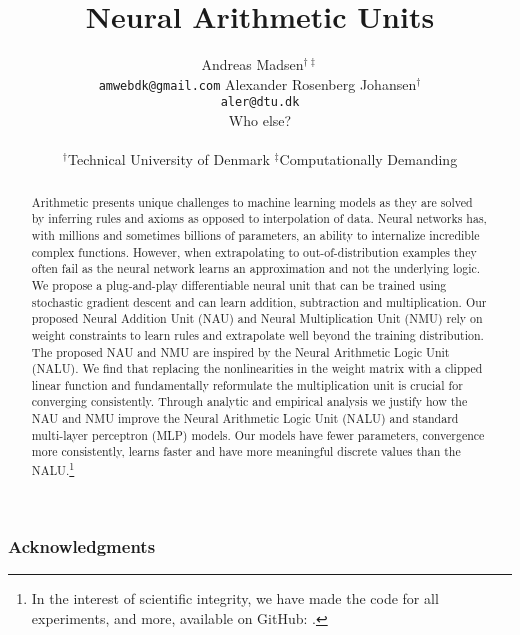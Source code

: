 \documentclass{article}
\title{Neural Arithmetic Units}
\author{%
  Andreas Madsen$^{\dag\ddag}$ \\
  \texttt{amwebdk@gmail.com}
  \AND
  Alexander Rosenberg Johansen$^{\dag}$ \\
  \texttt{aler@dtu.dk} \\
  \AND
  Who else? \\
  \\
$^\dag$Technical University of Denmark \quad
$^\ddag$Computationally Demanding
}
\begin{document}
\StopCensoring %

\maketitle

\begin{abstract}
Arithmetic presents unique challenges to machine learning models as they are solved by inferring rules and axioms as opposed to interpolation of data.
Neural networks has, with millions and sometimes billions of parameters, an ability to internalize incredible complex functions.
However, when extrapolating to out-of-distribution examples they often fail as the neural network learns an approximation and not the underlying logic.
We propose a plug-and-play differentiable neural unit that can be trained using stochastic gradient descent and can learn addition, subtraction and multiplication.
Our proposed Neural Addition Unit (NAU) and Neural Multiplication Unit (NMU) rely on weight constraints to learn rules and extrapolate well beyond the training distribution.
The proposed NAU and NMU are inspired by the Neural Arithmetic Logic Unit (NALU).
We find that replacing the nonlinearities in the weight matrix with a clipped linear function and fundamentally reformulate the multiplication unit is crucial for converging consistently.
Through analytic and empirical analysis we justify how the NAU and NMU improve the Neural Arithmetic Logic Unit (NALU) and standard multi-layer perceptron (MLP) models.
Our models have fewer parameters, convergence more consistently, learns faster and have more meaningful discrete values than the NALU.\footnote{In the interest of scientific integrity, we have made the code for all experiments, and more, available on GitHub: .}
\end{abstract}







\subsubsection*{Acknowledgments}





\newpage
\appendix



\end{document}
